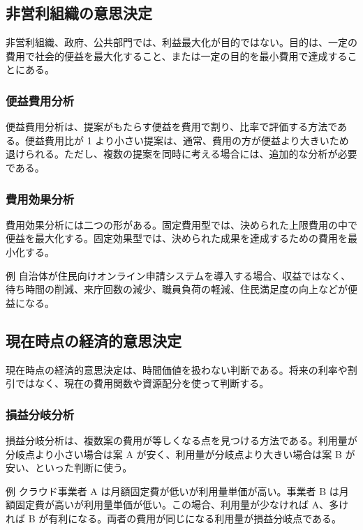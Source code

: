 \documentclass[a4paper,11pt]{ltjsarticle}
\numberwithin{figure}{section}
\numberwithin{table}{section}
\begin{document}
\subsection{非営利組織の意思決定}

非営利組織、政府、公共部門では、利益最大化が目的ではない。目的は、一定の費用で社会的便益を最大化すること、または一定の目的を最小費用で達成することにある。

\subsubsection{便益費用分析}

便益費用分析は、提案がもたらす便益を費用で割り、比率で評価する方法である。便益費用比が 1 より小さい提案は、通常、費用の方が便益より大きいため退けられる。ただし、複数の提案を同時に考える場合には、追加的な分析が必要である。

\subsubsection{費用効果分析}

費用効果分析には二つの形がある。固定費用型では、決められた上限費用の中で便益を最大化する。固定効果型では、決められた成果を達成するための費用を最小化する。

\begin{notebox}{例}
自治体が住民向けオンライン申請システムを導入する場合、収益ではなく、待ち時間の削減、来庁回数の減少、職員負荷の軽減、住民満足度の向上などが便益になる。
\end{notebox}

\subsection{現在時点の経済的意思決定}

現在時点の経済的意思決定は、時間価値を扱わない判断である。将来の利率や割引ではなく、現在の費用関数や資源配分を使って判断する。

\subsubsection{損益分岐分析}

損益分岐分析は、複数案の費用が等しくなる点を見つける方法である。利用量が分岐点より小さい場合は案 A が安く、利用量が分岐点より大きい場合は案 B が安い、といった判断に使う。

\begin{notebox}{例}
クラウド事業者 A は月額固定費が低いが利用量単価が高い。事業者 B は月額固定費が高いが利用量単価が低い。この場合、利用量が少なければ A、多ければ B が有利になる。両者の費用が同じになる利用量が損益分岐点である。
\end{notebox}
\end{document}
